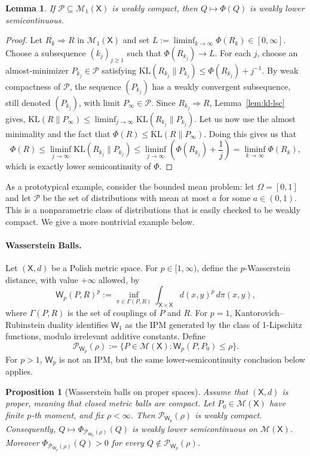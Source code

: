 \documentclass[11pt]{article}
\newcommand{\KL}{\mathrm{KL}}
\newcommand{\Pcal}{\mathcal{P}}
\newcommand{\X}{\mathsf{X}}
\newcommand{\M}{\mathcal{M}}
\newcommand{\Wass}{\mathsf W}
\newcommand{\dd}{d}
\newtheorem{proposition}[theorem]{Proposition}
\newtheorem{lemma}[theorem]{Lemma}
\theoremstyle{definition}
\theoremstyle{definition}
\begin{document}
\begin{lemma}\label{lem:phi-lsc}
If $\Pcal\subseteq\mathcal{M}_1(\X)$ is weakly compact, then $Q \mapsto \Phi(Q)$ is weakly lower semicontinuous.
\end{lemma}

\begin{proof}
Let $R_k\Rightarrow R$ in $\mathcal{M}_1(\X)$ and set $L:=\liminf_{k\to\infty}\Phi(R_k)\in[0,\infty]$.  Choose a subsequence $(k_j)_{j\ge1}$ such that $\Phi(R_{k_j})\to L$.  For each $j$, choose an almost-minimizer $P_{k_j}\in\Pcal$ satisfying $\KL(R_{k_j}\|P_{k_j})\le \Phi(R_{k_j})+j^{-1}$.  By weak compactness of $\Pcal$, the sequence $(P_{k_j})$ has a weakly convergent subsequence, still denoted $(P_{k_j})$, with limit $P_\infty\in\Pcal$.  Since $R_{k_j}\Rightarrow R$, Lemma~\ref{lem:kl-lsc} gives,
\(
\KL(R\|P_\infty)\le \liminf_{j\to\infty}\KL(R_{k_j}\|P_{k_j}).
\)
Let us now use the almost minimality and the fact that  $\Phi(R)\le \KL(R\|P_\infty)$. Doing this gives us that
\[
\Phi(R)\le \liminf_{j\to\infty}\KL(R_{k_j}\|P_{k_j})\le \liminf_{j\to\infty}\left(\Phi(R_{k_j})+\frac{1}{j}\right)=\liminf_{k\to\infty}\Phi(R_k),
\]
which is exactly lower semicontinuity of $\Phi$.
\end{proof}

As a prototypical example, consider the bounded mean problem: let $\Omega =[0,1]$ and let $\Pcal$ be the set of distributions with mean at most $a$ for some $a \in (0,1)$. This is a nonparametric class of distributions that is easily checked to be weakly compact. We give a more nontrivial example below.

\paragraph{Wasserstein Balls.}
Let \((\X,d)\) be a Polish metric space.  For \(p\in[1,\infty)\), define the \(p\)-Wasserstein distance, with value \(+\infty\) allowed, by
\[
  \Wass_p(P,R)^p
  :=\inf_{\pi\in\Gamma(P,R)}\int_{\X\times\X}d(x,y)^p\,\dd\pi(x,y),
\]
where \(\Gamma(P,R)\) is the set of couplings of \(P\) and \(R\).  For \(p=1\), Kantorovich--Rubinstein duality identifies \(\Wass_1\) as the IPM generated by the class of 1-Lipschitz functions, modulo irrelevant additive constants.  
Define
\[
  \Pcal_{\Wass_p}(\rho)
  :=\{P\in\M(\X):\Wass_p(P,P_0)\le\rho\}.
\]
For \(p>1\), \(\Wass_p\) is not an IPM, but the same lower-semicontinuity conclusion below applies.

\begin{proposition}[Wasserstein balls on proper spaces]\label{prop:wasserstein-lsc}
Assume that \((\X,d)\) is proper, meaning that closed metric balls are compact.  Let \(P_0\in\M(\X)\) have finite \(p\)-th moment, and fix \(\rho<\infty\).  
Then \(\Pcal_{\Wass_p}(\rho)\) is weakly compact.  Consequently,
\(
  Q\mapsto
  \Phi_{\Pcal_{\Wass_p}(\rho)}(Q)
\)
is weakly lower semicontinuous on \(\M(\X)\).  Moreover \(\Phi_{\Pcal_{\Wass_p}(\rho)}(Q)>0\) for every \(Q\notin\Pcal_{\Wass_p}(\rho)\).  
\end{proposition}
\end{document}
